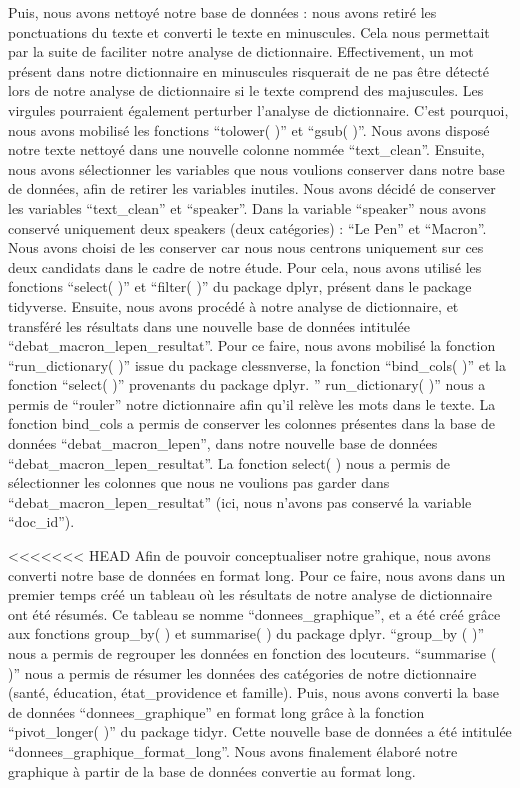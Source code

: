 \documentclass[
  letterpaper,
  DIV=11,
  numbers=noendperiod]{scrartcl}
\begin{document}
Puis, nous avons nettoyé notre base de données : nous avons retiré les
ponctuations du texte et converti le texte en minuscules. Cela nous
permettait par la suite de faciliter notre analyse de dictionnaire.
Effectivement, un mot présent dans notre dictionnaire en minuscules
risquerait de ne pas être détecté lors de notre analyse de dictionnaire
si le texte comprend des majuscules. Les virgules pourraient également
perturber l'analyse de dictionnaire. C'est pourquoi, nous avons mobilisé
les fonctions ``tolower( )'' et ``gsub( )''. Nous avons disposé notre
texte nettoyé dans une nouvelle colonne nommée ``text\_clean''. Ensuite,
nous avons sélectionner les variables que nous voulions conserver dans
notre base de données, afin de retirer les variables inutiles. Nous
avons décidé de conserver les variables ``text\_clean'' et ``speaker''.
Dans la variable ``speaker'' nous avons conservé uniquement deux
speakers (deux catégories) : ``Le Pen'' et ``Macron''. Nous avons choisi
de les conserver car nous nous centrons uniquement sur ces deux
candidats dans le cadre de notre étude. Pour cela, nous avons utilisé
les fonctions ``select( )'' et ``filter( )'' du package dplyr, présent
dans le package tidyverse. Ensuite, nous avons procédé à notre analyse
de dictionnaire, et transféré les résultats dans une nouvelle base de
données intitulée ``debat\_macron\_lepen\_resultat''. Pour ce faire,
nous avons mobilisé la fonction ``run\_dictionary( )'' issue du package
clessnverse, la fonction ``bind\_cols( )'' et la fonction ``select( )''
provenants du package dplyr. '' run\_dictionary( )'' nous a permis de
``rouler'' notre dictionnaire afin qu'il relève les mots dans le texte.
La fonction bind\_cols a permis de conserver les colonnes présentes dans
la base de données ``debat\_macron\_lepen'', dans notre nouvelle base de
données ``debat\_macron\_lepen\_resultat''. La fonction select( ) nous a
permis de sélectionner les colonnes que nous ne voulions pas garder dans
``debat\_macron\_lepen\_resultat'' (ici, nous n'avons pas conservé la
variable ``doc\_id'').

<<<<<<< HEAD
Afin de pouvoir conceptualiser notre grahique, nous avons converti notre
base de données en format long. Pour ce faire, nous avons dans un
premier temps créé un tableau où les résultats de notre analyse de
dictionnaire ont été résumés. Ce tableau se nomme
``donnees\_graphique'', et a été créé grâce aux fonctions group\_by( )
et summarise( ) du package dplyr. ``group\_by ( )'' nous a permis de
regrouper les données en fonction des locuteurs. ``summarise ( )'' nous
a permis de résumer les données des catégories de notre dictionnaire
(santé, éducation, état\_providence et famille). Puis, nous avons
converti la base de données ``donnees\_graphique'' en format long grâce
à la fonction ``pivot\_longer( )'' du package tidyr. Cette nouvelle base
de données a été intitulée ``donnees\_graphique\_format\_long''. Nous
avons finalement élaboré notre graphique à partir de la base de données
convertie au format long.
\end{document}
